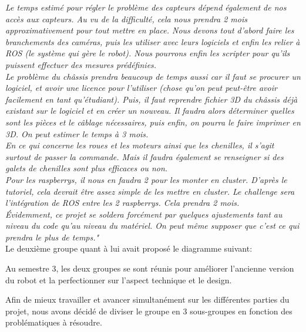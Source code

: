\documentclass{PackagerQualityN}
\begin{document}
\textit{Le temps estimé pour régler le problème des capteurs dépend également de nos accès aux capteurs. Au vu de la difficulté, cela nous prendra 2 mois approximativement pour tout mettre en place. Nous devons tout d’abord faire les branchements des caméras, puis les utiliser avec leurs logiciels et enfin les relier à ROS (le système qui gère le robot). Nous pourrons enfin les scripter pour qu’ils puissent effectuer des mesures prédéfinies.}\\

\textit{Le problème du châssis prendra beaucoup de temps aussi car il faut se procurer un logiciel, et avoir une licence pour l’utiliser (chose qu’on peut peut-être avoir facilement en tant qu’étudiant). Puis, il faut reprendre fichier 3D du châssis déjà existant sur le logiciel et en créer un nouveau. Il faudra alors déterminer quelles sont les pièces et le câblage nécessaires, puis enfin, on pourra le faire imprimer en 3D. On peut estimer le temps à 3 mois.}\\

\textit{En ce qui concerne les roues et les moteurs ainsi que les chenilles, il s’agit surtout de passer la commande. Mais il faudra également se renseigner si des galets de chenilles sont plus efficaces ou non.}\\
 

\textit{Pour les raspberrys, il nous en faudra 2 pour les monter en cluster. D’après le tutoriel, cela devrait être assez simple de les mettre en cluster. Le challenge sera l’intégration de ROS entre les 2 raspberrys. Cela prendra 2 mois.}\\

\textit{Évidemment, ce projet se soldera forcément par quelques ajustements tant au niveau du code qu’au niveau du matériel. On peut même supposer que c’est ce qui prendra le plus de temps."} \\

Le deuxième groupe quant à lui avait proposé le diagramme suivant:


Au semestre 3, les deux groupes se sont réunis pour améliorer l’ancienne version du robot et la perfectionner sur l’aspect technique et le design.

Afin de mieux travailler et avancer simultanément sur les différentes parties du projet, nous avons décidé de diviser le groupe en 3 sous-groupes en fonction des problématiques à résoudre.\\
\end{document}

